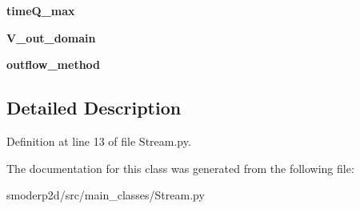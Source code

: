 \begin{DoxyCompactItemize}
\item 
\hypertarget{classsmoderp2d_1_1src_1_1main__classes_1_1Stream_1_1Reach_a2288c527275d3c1f29b4f9b4d7ba10ae}{{\bfseries time\-Q\-\_\-max}}\label{classsmoderp2d_1_1src_1_1main__classes_1_1Stream_1_1Reach_a2288c527275d3c1f29b4f9b4d7ba10ae}

\item 
\hypertarget{classsmoderp2d_1_1src_1_1main__classes_1_1Stream_1_1Reach_afa1bc9e1ee93bf29c4d2a1585a9ca800}{{\bfseries V\-\_\-out\-\_\-domain}}\label{classsmoderp2d_1_1src_1_1main__classes_1_1Stream_1_1Reach_afa1bc9e1ee93bf29c4d2a1585a9ca800}

\item 
\hypertarget{classsmoderp2d_1_1src_1_1main__classes_1_1Stream_1_1Reach_ae43e6508ba3aead29d195425d3b342c2}{{\bfseries outflow\-\_\-method}}\label{classsmoderp2d_1_1src_1_1main__classes_1_1Stream_1_1Reach_ae43e6508ba3aead29d195425d3b342c2}

\end{DoxyCompactItemize}


\subsection{Detailed Description}


Definition at line 13 of file Stream.\-py.



The documentation for this class was generated from the following file\-:\begin{DoxyCompactItemize}
\item 
smoderp2d/src/main\-\_\-classes/Stream.\-py\end{DoxyCompactItemize}
